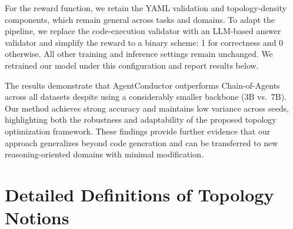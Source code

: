 \documentclass{article}
\theoremstyle{definition}
\begin{document}
For the reward function, we retain the YAML validation and topology-density components, which remain general across tasks and domains. To adapt the pipeline, we replace the code-execution validator with an LLM-based answer validator and simplify the reward to a binary scheme: 1 for correctness and 0 otherwise. All other training and inference settings remain unchanged. We retrained our model under this configuration and report results below.

\begin{table}[h]
\centering
\caption{Cross-domain evaluation of AgentConductor on GAIA, HLE, and PopQA. Results are reported as mean $\pm$ std over three seeds.}
\label{tab:cross_domain}
\vspace{0.5em}

\setlength{\tabcolsep}{3pt} %
\renewcommand{\arraystretch}{1.15}
\fontsize{7.5pt}{9.5pt}\selectfont

\end{table}


The results demonstrate that AgentConductor outperforms Chain-of-Agents across all datasets despite using a considerably smaller backbone (3B vs.\ 7B). Our method achieves strong accuracy and maintains low variance across seeds, highlighting both the robustness and adaptability of the proposed topology optimization framework. These findings provide further evidence that our approach generalizes beyond code generation and can be transferred to new reasoning-oriented domains with minimal modification.


\section{Detailed Definitions of Topology Notions}
\label{appendix:notions}
\end{document}
